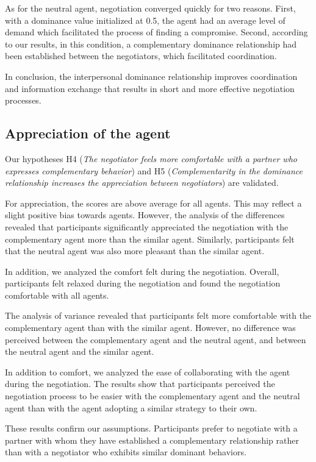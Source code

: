 \documentclass{llncs}
\begin{document}
As for the neutral agent, negotiation converged quickly for two reasons. First, with a dominance value initialized at 0.5, the agent had an average level of demand which facilitated the process of finding a compromise. 
Second, according to our results, in this condition, a complementary dominance relationship had been established between the negotiators, which facilitated coordination. 

In conclusion, the interpersonal dominance relationship improves coordination and information exchange that results in short and more effective negotiation processes.

\subsection{Appreciation of the agent}
Our hypotheses H4 (\textit{The negotiator feels more comfortable with a partner who expresses complementary behavior}) and H5 (\textit{Complementarity in the dominance relationship increases the appreciation between negotiators}) are validated. 

For appreciation, the scores are above average for all agents. This may reflect a slight positive bias towards agents. However, the analysis of the differences revealed that participants significantly appreciated the negotiation with the complementary agent more than the similar agent. Similarly, participants felt that the neutral agent was also more pleasant than the similar agent. 

In addition, we analyzed the comfort felt during the negotiation. Overall, participants felt relaxed during the negotiation and found the negotiation comfortable with all agents.  

The analysis of variance revealed that participants felt more comfortable with the complementary agent than with the similar agent. However, no difference was perceived between the complementary agent and the neutral agent, and between the neutral agent and the similar agent.

In addition to comfort, we analyzed the ease of collaborating with the agent during the negotiation. The results show that participants perceived the negotiation process to be easier with the complementary agent and the neutral agent than with the agent adopting a similar strategy to their own. 

These results confirm our assumptions. Participants prefer to negotiate with a partner with whom they have established a complementary relationship rather than with a negotiator who exhibits similar dominant behaviors. 
\end{document}
